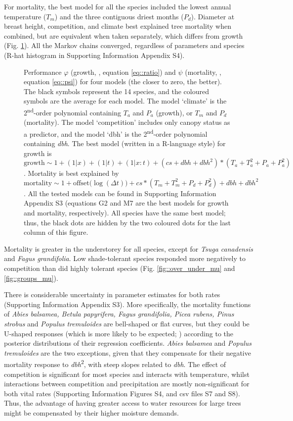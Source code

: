For mortality, the best model for all the species included the lowest annual temperature ($ T_m $) and the three contiguous driest months ($ P_d $). Diameter at breast height, competition, and climate best explained tree mortality when combined, but are equivalent when taken separately, which differs from growth (Fig. \ref{fig::aic_waic}). All the Markov chains converged, regardless of parameters and species (R-hat histogram in Supporting Information Appendix S4). 
\begin{figure}
	\centering
	
	\caption{Performance $ \varphi $ (growth, \CircSteel, equation \ref{eq::ratio}) and $ \psi $ (mortality, \MoveUp, equation \ref{eq::psi}) for four models (the closer to zero, the better). The black symbols represent the 14 species, and the coloured symbols are the average for each model. The model `climate' is the 2\textsuperscript{nd}-order polynomial containing $ T_a $ and $ P_a $ (growth), or $ T_m $ and $ P_d $ (mortality). The model `competition' includes only canopy status as a predictor, and the model `dbh' is the 2\textsuperscript{nd}-order polynomial containing \textit{dbh}. The best model (written in a R-language style) for growth is $ \text{growth} \sim 1 + (1 | x) + (1 | t) + (1 | x:t) + (cs + dbh + dbh^2) * (T_a + T_a^2 + P_a + P_a^2) $. Mortality is best explained by $ \text{mortality} \sim 1 + \text{offset}\big( \log(\Delta t) \big) + cs*(T_m + T_m^2 + P_d + P_d^2) + dbh + dbh^2 $. All the tested models can be found in Supporting Information Appendix S3 (equations G2 and M7 are the best models for growth and mortality, respectively). All species have the same best model; thus, the black dots are hidden by the two coloured dots for the last column of this figure. \label{fig::aic_waic}}
\end{figure}
Mortality is greater in the understorey for all species, except for \textit{Tsuga canadensis} and \textit{Fagus grandifolia}. Low shade-tolerant species responded more negatively to competition than did highly tolerant species (Fig. \ref{fig::over_under_mu} and \ref{fig::groups_mu}).

There is considerable uncertainty in parameter estimates for both rates (Supporting Information Appendix S3). More specifically, the mortality functions of \textit{Abies balsamea, Betula papyrifera, Fagus grandifolia, Picea rubens, Pinus strobus} and \textit{Populus tremuloides} are bell-shaped or flat curves, but they could be U-shaped responses (which is more likely to be expected; \citet{Lines2010}) according to the posterior distributions of their regression coefficients. \textit{Abies balsamea} and \textit{Populus tremuloides} are the two exceptions, given that they compensate for their negative mortality response to \textit{dbh}\textsuperscript{2}, with steep slopes related to \textit{dbh}. The effect of competition is significant for most species and interacts with temperature, whilst interactions between competition and precipitation are mostly non-significant for both vital rates (Supporting Information Figures S4, and csv files S7 and S8). Thus, the advantage of having greater access to water resources for large trees might be compensated by their higher moisture demands.

